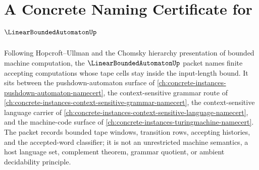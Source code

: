 \chapter{A Concrete Naming Certificate for $\LinearBoundedAutomatonUp$}
\label{ch:concrete-instances-linear-bounded-automaton-namecert}

Following Hopcroft--Ullman and the Chomsky hierarchy presentation of bounded machine computation, the $\LinearBoundedAutomatonUp$ packet names finite accepting computations whose tape cells stay inside the input-length bound. It sits between the pushdown-automaton surface of \autoref{ch:concrete-instances-pushdown-automaton-namecert}, the context-sensitive grammar route of \autoref{ch:concrete-instances-context-sensitive-grammar-namecert}, the context-sensitive language carrier of \autoref{ch:concrete-instances-context-sensitive-language-namecert}, and the machine-code surface of \autoref{ch:concrete-instances-turingmachine-namecert}. The packet records bounded tape windows, transition rows, accepting histories, and the accepted-word classifier; it is not an unrestricted machine semantics, a host language set, complement theorem, grammar quotient, or ambient decidability principle.

